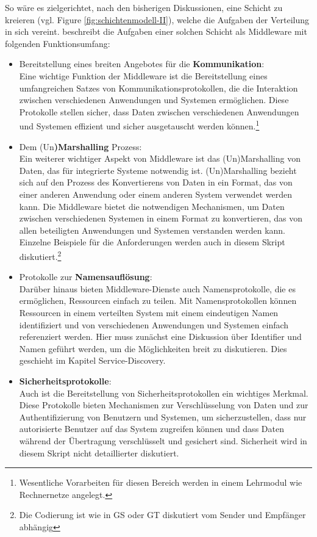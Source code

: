 \documentclass[../vs-script-first-v01.tex]{subfiles}
\begin{document}
So wäre es zielgerichtet, nach den bisherigen Diskussionen, eine Schicht zu kreieren (vgl. Figure \ref{fig:schichtenmodell-II}), welche die Aufgaben der Verteilung in sich vereint.
\cite{tanenbaum2017distributed} beschreibt die Aufgaben einer solchen Schicht als Middleware mit folgenden Funktionsumfang:
\begin{itemize}
\item Bereitstellung eines breiten Angebotes für die \textbf{Kommunikation}: \\
Eine wichtige Funktion der Middleware ist die Bereitstellung eines umfangreichen Satzes von Kommunikationsprotokollen, die die Interaktion zwischen verschiedenen Anwendungen und Systemen ermöglichen. Diese Protokolle stellen sicher, dass Daten zwischen verschiedenen Anwendungen und Systemen effizient und sicher ausgetauscht werden können.\footnote{Wesentliche Vorarbeiten für diesen Bereich werden in einem Lehrmodul wie Rechnernetze angelegt.}
\item Dem (Un\textbf{)Marshalling} Prozess:\\ Ein weiterer wichtiger Aspekt von Middleware ist das (Un)Marshalling von Daten, das für integrierte Systeme notwendig ist. (Un)Marshalling bezieht sich auf den Prozess des Konvertierens von Daten in ein Format, das von einer anderen Anwendung oder einem anderen System verwendet werden kann. Die Middleware bietet die notwendigen Mechanismen, um Daten zwischen verschiedenen Systemen in einem Format zu konvertieren, das von allen beteiligten Anwendungen und Systemen verstanden werden kann. Einzelne Beispiele für die Anforderungen werden auch in diesem Skript diskutiert.\footnote{Die Codierung ist wie in GS oder GT diskutiert vom Sender und Empfänger abhängig}
\item Protokolle zur \textbf{Namensauflösung}:\\ Darüber hinaus bieten Middleware-Dienste auch Namensprotokolle, die es ermöglichen, Ressourcen einfach zu teilen. Mit Namensprotokollen können Ressourcen in einem verteilten System mit einem eindeutigen Namen identifiziert und von verschiedenen Anwendungen und Systemen einfach referenziert werden. Hier muss zunächst eine Diskussion über Identifier und Namen geführt werden, um die Möglichkeiten breit zu diskutieren. Dies geschieht im Kapitel Service-Discovery.
\item \textbf{Sicherheitsprotokolle}:\\ Auch ist die Bereitstellung von Sicherheitsprotokollen ein wichtiges Merkmal. Diese Protokolle bieten Mechanismen zur Verschlüsselung von Daten und zur Authentifizierung von Benutzern und Systemen, um sicherzustellen, dass nur autorisierte Benutzer auf das System zugreifen können und dass Daten während der Übertragung verschlüsselt und gesichert sind. Sicherheit wird in diesem Skript nicht detaillierter diskutiert.

\end{itemize}
\end{document}
